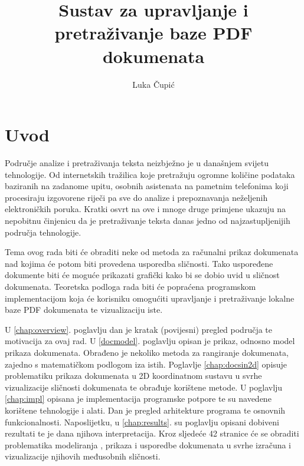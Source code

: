 \documentclass[times, utf8, zavrsni, numeric]{fer}
\begin{document}

\title{Sustav za upravljanje i pretraživanje baze PDF dokumenata}

\author{Luka Čupić}

\maketitle

\izvornik

\zahvala{}

\tableofcontents

\chapter{Uvod}
Područje analize i pretraživanja teksta neizbježno je u današnjem svijetu tehnologije. Od internetskih tražilica koje pretražuju ogromne količine podataka baziranih na zadanome upitu, osobnih asistenata na pametnim telefonima koji procesiraju izgovorene riječi pa sve do analize i prepoznavanja neželjenih elektroničkih poruka.
Kratki osvrt na ove i mnoge druge primjene ukazuju na nepobitnu činjenicu da je pretraživanje teksta danas jedno od najzastupljenijih područja tehnologije.

Tema ovog rada biti će obraditi neke od metoda za računalni prikaz dokumenata nad kojima će potom biti provedena usporedba sličnosti. Tako uspoređene dokumente biti će moguće prikazati grafički kako bi se dobio uvid u sličnost dokumenata. Teoretska podloga rada biti će popraćena programskom implementacijom koja će korisniku omogućiti upravljanje i pretraživanje lokalne baze PDF dokumenata te vizualizaciju iste.

U \ref{chap:overview}. poglavlju dan je kratak (povijesni) pregled područja te motivacija za ovaj rad. U \ref{docmodel}. poglavlju opisan je prikaz, odnosno model prikaza dokumenata. Obrađeno je nekoliko metoda za rangiranje dokumenata, zajedno s matematičkom podlogom iza istih. Poglavlje \ref{chap:docsin2d} opisuje problematiku prikaza dokumenata u 2D koordinatnom sustavu u svrhe vizualizacije sličnosti dokumenata te obrađuje korištene metode. U poglavlju \ref{chap:impl} opisana je implementacija programske potpore te su navedene korištene tehnologije i alati. Dan je pregled arhitekture programa te osnovnih funkcionalnosti. Naposlijetku, u \ref{chap:results}. su poglavlju opisani dobiveni rezultati te je dana njihova interpretacija. Kroz sljedeće 42 stranice će se obraditi problematika modeliranja \cite{adams1978hitchhikers}, prikaza i usporedbe dokumenata u svrhe izračuna i vizualizacije njihovih međusobnih sličnosti.
\end{document}

